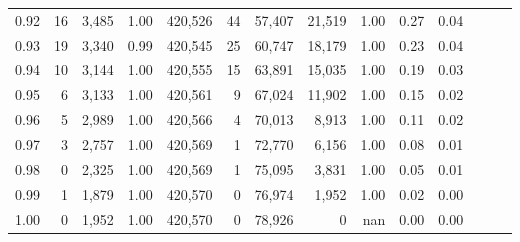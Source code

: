 \begin{tabular}{rrrrrrrrrrrrrr}
0.92 &     16 &  3,485 &  1.00 &  420,526 &       44 &  57,407 &  21,519 &  1.00 &  0.27 &      0.04 \\
0.93 &     19 &  3,340 &  0.99 &  420,545 &       25 &  60,747 &  18,179 &  1.00 &  0.23 &      0.04 \\
0.94 &     10 &  3,144 &  1.00 &  420,555 &       15 &  63,891 &  15,035 &  1.00 &  0.19 &      0.03 \\
0.95 &      6 &  3,133 &  1.00 &  420,561 &        9 &  67,024 &  11,902 &  1.00 &  0.15 &      0.02 \\
0.96 &      5 &  2,989 &  1.00 &  420,566 &        4 &  70,013 &   8,913 &  1.00 &  0.11 &      0.02 \\
0.97 &      3 &  2,757 &  1.00 &  420,569 &        1 &  72,770 &   6,156 &  1.00 &  0.08 &      0.01 \\
0.98 &      0 &  2,325 &  1.00 &  420,569 &        1 &  75,095 &   3,831 &  1.00 &  0.05 &      0.01 \\
0.99 &      1 &  1,879 &  1.00 &  420,570 &        0 &  76,974 &   1,952 &  1.00 &  0.02 &      0.00 \\
1.00 &      0 &  1,952 &  1.00 &  420,570 &        0 &  78,926 &       0 &   nan &  0.00 &      0.00 \\
\bottomrule
\end{tabular}
